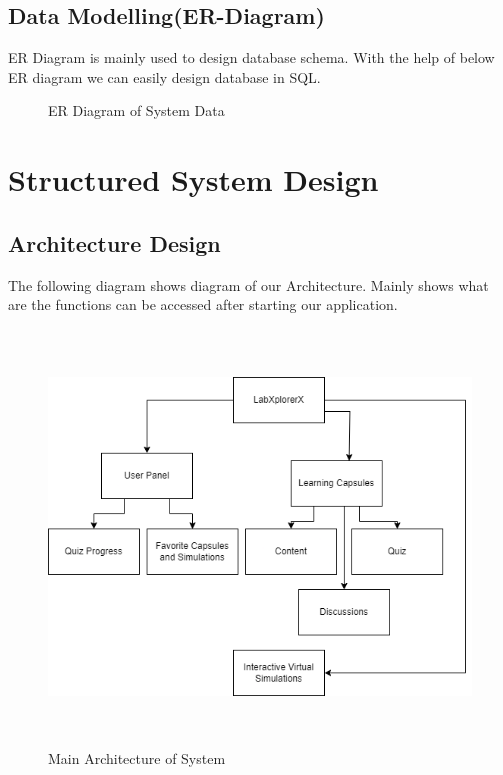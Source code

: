 \subsection{Data Modelling(ER-Diagram)}
ER Diagram is mainly used to design database schema. With the help of below ER diagram we can easily design database in SQL.
\begin{figure}[H]
    \centering
    \caption{ER Diagram of System Data}
\end{figure}
\newpage
\section{Structured System Design}
\subsection{Architecture Design}
The following diagram shows diagram of our Architecture. Mainly shows what are the functions can be accessed after starting our application.
\begin{figure}[H]
    \includegraphics[height = 11cm]{Diagrams/Main_Block.png}
    \caption{Main Architecture of System}
\end{figure}
\newpage
